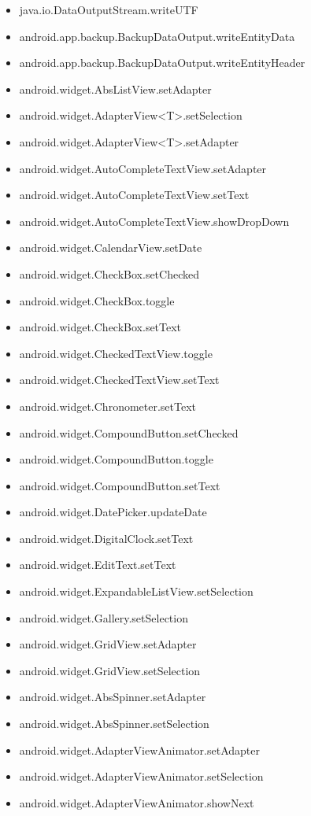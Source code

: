 \documentclass{sig-alternate}
\begin{document}
\begin{itemize}
\item java.io.DataOutputStream.writeUTF
\item android.app.backup.BackupDataOutput.writeEntityData
\item android.app.backup.BackupDataOutput.writeEntityHeader
\item android.widget.AbsListView.setAdapter
\item android.widget.AdapterView<T>.setSelection
\item android.widget.AdapterView<T>.setAdapter
\item android.widget.AutoCompleteTextView.setAdapter
\item android.widget.AutoCompleteTextView.setText
\item android.widget.AutoCompleteTextView.showDropDown
\item android.widget.CalendarView.setDate
\item android.widget.CheckBox.setChecked
\item android.widget.CheckBox.toggle
\item android.widget.CheckBox.setText
\item android.widget.CheckedTextView.toggle
\item android.widget.CheckedTextView.setText
\item android.widget.Chronometer.setText
\item android.widget.CompoundButton.setChecked
\item android.widget.CompoundButton.toggle
\item android.widget.CompoundButton.setText
\item android.widget.DatePicker.updateDate
\item android.widget.DigitalClock.setText
\item android.widget.EditText.setText
\item android.widget.ExpandableListView.setSelection
\item android.widget.Gallery.setSelection
\item android.widget.GridView.setAdapter
\item android.widget.GridView.setSelection
\item android.widget.AbsSpinner.setAdapter
\item android.widget.AbsSpinner.setSelection
\item android.widget.AdapterViewAnimator.setAdapter
\item android.widget.AdapterViewAnimator.setSelection
\item android.widget.AdapterViewAnimator.showNext

\end{itemize}
\end{document}
